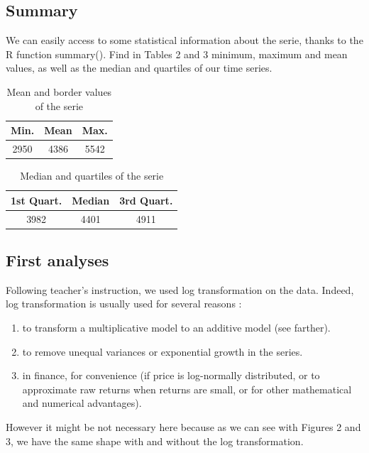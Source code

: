 \subsection{Summary}
We can easily access to some statistical information about the serie, thanks to the R function summary(). Find in Tables 2 and 3 minimum, maximum and mean values, as well as the median and quartiles of our time series. \\

\FloatBarrier
\begin{table}[!htbp]
  \centering
  \begin{tabular}{|c c c|} 
  \hline
  Min. & Mean & Max. \\
  \hline
  2950 & 4386 & 5542 \\ 
  \hline
  \end{tabular}
  \caption{Mean and border values of the serie}
\end{table}
\FloatBarrier
\begin{table}[!htbp]
   \centering
   \begin{tabular}{|c c c|} 
   \hline
   1st Quart. & Median & 3rd Quart. \\
   \hline
   3982 & 4401 & 4911 \\ 
   \hline
  \end{tabular}
  \caption{Median and quartiles of the serie}
\end{table}
\FloatBarrier

\subsection{First analyses}
Following teacher's instruction, we used log transformation on the data.
Indeed, log transformation is usually used for several reasons :
\begin{enumerate}
\item to transform a multiplicative model to an additive model (see farther).
\item to remove unequal variances or exponential growth in the series.
\item in finance, for convenience (if price is log-normally distributed, or to approximate raw returns when returns are small, or for other mathematical and numerical advantages).
\end{enumerate}
However it might be not necessary here because as we can see with Figures 2 and 3, we have the same shape with and without the log transformation. \\

